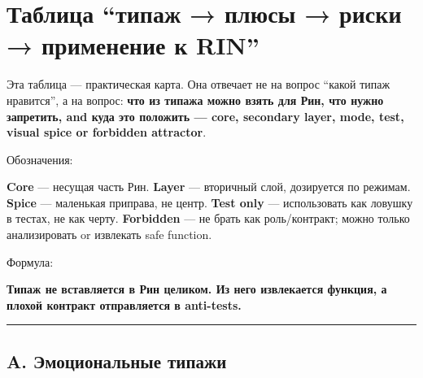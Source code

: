 \section{Таблица “типаж → плюсы → риски → применение к RIN”}

Эта таблица --- практическая карта. Она отвечает не на вопрос ``какой
типаж нравится'', а на вопрос: \textbf{что из типажа можно взять для
Рин, что нужно запретить, and куда это положить --- core, secondary
layer, mode, test, visual spice or forbidden attractor}.

Обозначения:

\textbf{Core} --- несущая часть Рин. \textbf{Layer} --- вторичный слой,
дозируется по режимам. \textbf{Spice} --- маленькая приправа, не центр.
\textbf{Test only} --- использовать как ловушку в тестах, не как черту.
\textbf{Forbidden} --- не брать как роль/\hspace{0pt}контракт; можно только
анализировать or извлекать safe function.

Формула:

\textbf{Типаж не вставляется в Рин целиком. Из него извлекается функция,
а плохой контракт отправляется в anti-tests.}

\begin{center}\rule{0.5\linewidth}{0.5pt}\end{center}

\subsection*{A. Эмоциональные типажи}


